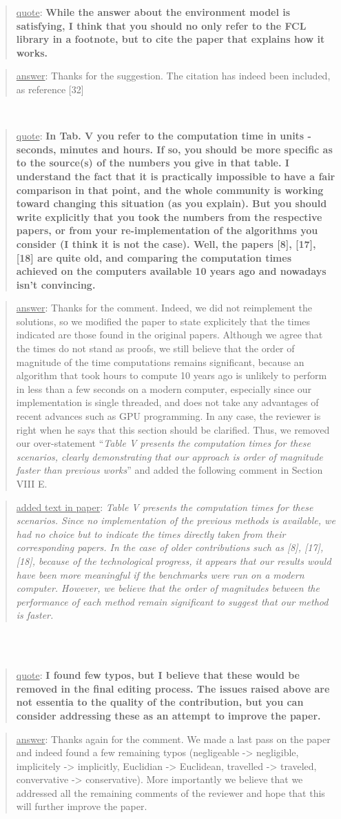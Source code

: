 \documentclass[a4paper]{article}
\newcommand\quot[1]{\begin{quote} \underline{quote}: \textbf{#1}\end{quote}}
\newcommand\as[1]{\begin{quote} \underline{answer}: {#1}\end{quote} }
\newcommand\qt[1]{\begin{quote} \underline{added text in paper}: \textit{#1}\end{quote} \leavevmode \\ }
\begin{document}
\quot{
While the answer about the environment model is satisfying, I think
that you should no only refer to the FCL library in a footnote, but to
cite the paper that explains how it works.
}
\as{Thanks for the suggestion. The citation has indeed been included, as reference [32]}
\leavevmode \\

\quot{
In Tab. V you refer to the computation time in units - seconds,
minutes and hours. If so, you should be more specific as to the
source(s) of the numbers you give in that table. I understand the fact
that it is practically impossible to have a fair comparison in that
point, and the whole community is working toward changing this
situation (as you explain). But you should write explicitly that you
took the numbers from the respective papers, or from your
re-implementation of the algorithms you consider (I think it is not the
case). Well, the papers [8], [17], [18] are quite old, and comparing
the computation times achieved on the computers available 10 years ago
and nowadays isn't convincing. 
}
\as{Thanks for the comment. Indeed, we did not reimplement the solutions, so we modified the paper to state explicitely that the times indicated are those found in the original papers. Although we agree that the times do not stand as proofs, we still believe that the order of magnitude of the time computations remains significant, because an algorithm that took hours to compute 10 years ago is unlikely to perform in less than a few seconds on a modern computer, especially since our implementation is single threaded, and does not take any advantages of recent advances such as GPU programming. In any case, the reviewer is right when he says that this section should be clarified.
Thus, we removed our over-statement ``\textit{Table V presents the computation times for these scenarios, clearly demonstrating that our approach is order of magnitude faster than previous works}'' and added the following comment in Section VIII E.}
\qt{
Table V presents the computation times for these scenarios. Since no implementation of the previous methods is available, we had no choice but to indicate the times directly taken from their corresponding papers.
In the case of older contributions such as [8], [17], [18], because of the technological progress, it appears that our results would have been more meaningful if the benchmarks were run on a modern computer. However, we believe that the order of magnitudes between the performance of each method remain significant to suggest that our method is faster.
}
\leavevmode \\

\quot{I found few typos, but I believe that these would be removed in the
final editing process. 
The issues raised above are not essentia to the quality of the
contribution, but you can consider addressing these as an attempt to
improve the paper. }
\as{Thanks again for the comment. We made a last pass on the paper and indeed found a few remaining typos (negligeable -> negligible, implicitely -> implicitly, Euclidian -> Euclidean, travelled -> traveled, convervative -> conservative). More importantly we believe that we addressed all the remaining comments of the reviewer and hope that this will further improve the paper.}
\end{document}
